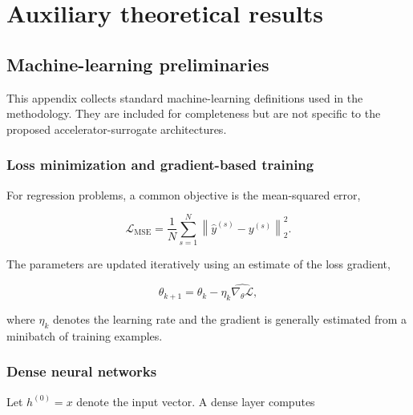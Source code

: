 
\chapter{Auxiliary theoretical results}
\label{sec:auxiliary_theoretical_results_auxiliary_theoretical_results}

\section{Machine-learning preliminaries}
\label{sec:auxiliary_theoretical_results_machine_learning_preliminaries}

This appendix collects standard machine-learning definitions used in the methodology. They are included for completeness but are not specific to the proposed accelerator-surrogate architectures.

\subsection{Loss minimization and gradient-based training}
\label{sec:auxiliary_theoretical_results_loss_minimization_and_gradient_based_training}

For regression problems, a common objective is the mean-squared error,

\begin{equation}
\label{eq:213}
\mathcal L_{\mathrm{MSE}}=\frac1N\sum_{s=1}^{N}\left\|\widehat y^{(s)}-y^{(s)}\right\|_2^2.
\end{equation}

The parameters are updated iteratively using an estimate of the loss gradient,

\begin{equation}
\label{eq:214}
\theta_{k+1}=\theta_k-\eta_k\widehat{\nabla_{\theta}\mathcal L},
\end{equation}

where \(\eta_{k}\) denotes the learning rate and the gradient is generally estimated from a minibatch of training examples.

\subsection{Dense neural networks}
\label{sec:auxiliary_theoretical_results_dense_neural_networks}

Let \(h^{( 0 )} = x\) denote the input vector. A dense layer computes

